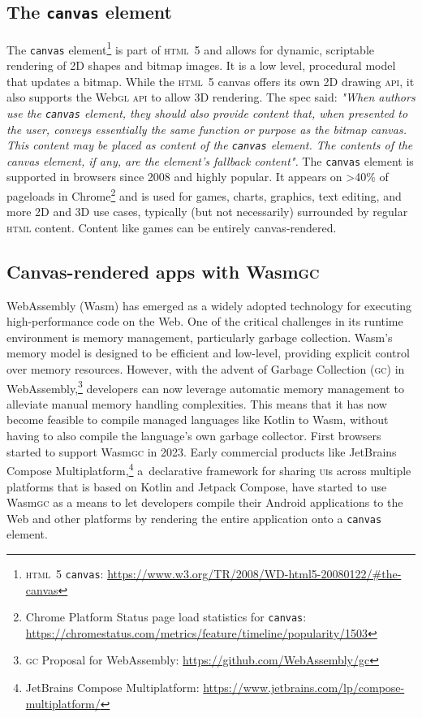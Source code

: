 \documentclass[sigconf]{acmart}
\begin{document}
\subsection{The \texttt{canvas} element}

The \texttt{canvas} element\footnote{\textsc{html}\ 5 \texttt{canvas}: \url{https://www.w3.org/TR/2008/WD-html5-20080122/#the-canvas}} is part of \textsc{html}\ 5 and allows for dynamic, scriptable rendering of 2D shapes and bitmap images. It is a low level, procedural model that updates a bitmap. While the \textsc{html}\ 5 canvas offers its own 2D drawing \textsc{api}, it also supports the Web\textsc{gl} \textsc{api} to allow 3D rendering. The spec said: \textit{"When authors use the \texttt{canvas} element, they should also provide content that, when presented to the user, conveys essentially the same function or purpose as the bitmap canvas. This content may be placed as content of the \texttt{canvas} element. The contents of the canvas element, if any, are the element's fallback content".} The \texttt{canvas} element is supported in browsers since 2008 and highly popular. It appears on >40\% of pageloads in Chrome\footnote{Chrome Platform Status page load statistics for \texttt{canvas}: \url{https://chromestatus.com/metrics/feature/timeline/popularity/1503}} and is used for games, charts, graphics, text editing, and more 2D and 3D use cases, typically (but not necessarily) surrounded by regular \textsc{html} content. Content like games can be entirely canvas-rendered.

\subsection{Canvas-rendered apps with Wasm\textsc{gc}}

WebAssembly (Wasm) has emerged as a widely adopted technology for executing high-performance code on the Web. One of the critical challenges in its runtime environment is memory management, particularly garbage collection. Wasm's memory model is designed to be efficient and low-level, providing explicit control over memory resources. However, with the advent of Garbage Collection (\textsc{gc}) in WebAssembly,\footnote{\textsc{gc} Proposal for WebAssembly: \url{https://github.com/WebAssembly/gc}} developers can now leverage automatic memory management to alleviate manual memory handling complexities. This means that it has now become feasible to compile managed languages like Kotlin to Wasm, without having to also compile the language's own garbage collector. First browsers started to support Wasm\textsc{gc} in 2023.  Early commercial products like JetBrains Compose Multiplatform,\footnote{JetBrains Compose Multiplatform: \url{https://www.jetbrains.com/lp/compose-multiplatform/}} a~declarative framework for sharing \textsc{ui}s across multiple platforms that is based on Kotlin and Jetpack Compose, have started to use Wasm\textsc{gc} as a means to let developers compile their Android applications to the Web and other platforms by rendering the entire application onto a \texttt{canvas} element.
\end{document}
